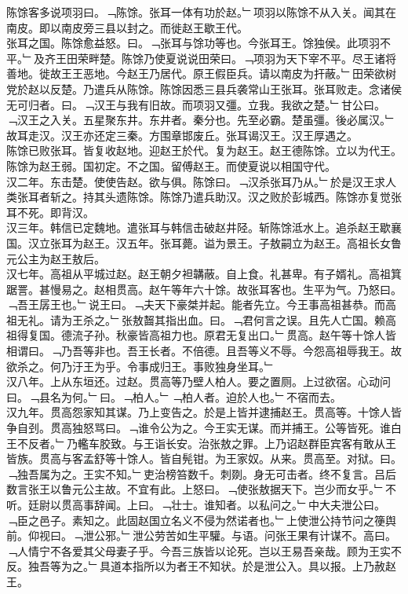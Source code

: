\documentclass{zhvt-classic}
\begin{document}
\hspace*{2em}陈馀客多说项羽曰。﹁陈馀。张耳一体有功於赵。﹂项羽以陈馀不从入关。闻其在南皮。即以南皮旁三县以封之。而徙赵王歇王代。\\
\hspace*{2em}张耳之国。陈馀愈益怒。曰。﹁张耳与馀功等也。今张耳王。馀独侯。此项羽不平。﹂及齐王田荣畔楚。陈馀乃使夏说说田荣曰。﹁项羽为天下宰不平。尽王诸将善地。徙故王王恶地。今赵王乃居代。原王假臣兵。请以南皮为扞蔽。﹂田荣欲树党於赵以反楚。乃遣兵从陈馀。陈馀因悉三县兵袭常山王张耳。张耳败走。念诸侯无可归者。曰。﹁汉王与我有旧故。而项羽又彊。立我。我欲之楚。﹂甘公曰。﹁汉王之入关。五星聚东井。东井者。秦分也。先至必霸。楚虽彊。後必属汉。﹂故耳走汉。汉王亦还定三秦。方围章邯废丘。张耳谒汉王。汉王厚遇之。\\
\hspace*{2em}陈馀已败张耳。皆复收赵地。迎赵王於代。复为赵王。赵王德陈馀。立以为代王。陈馀为赵王弱。国初定。不之国。留傅赵王。而使夏说以相国守代。\\
\hspace*{2em}汉二年。东击楚。使使告赵。欲与俱。陈馀曰。﹁汉杀张耳乃从。﹂於是汉王求人类张耳者斩之。持其头遗陈馀。陈馀乃遣兵助汉。汉之败於彭城西。陈馀亦复觉张耳不死。即背汉。\\
\hspace*{2em}汉三年。韩信已定魏地。遣张耳与韩信击破赵井陉。斩陈馀泜水上。追杀赵王歇襄国。汉立张耳为赵王。汉五年。张耳薨。谥为景王。子敖嗣立为赵王。高祖长女鲁元公主为赵王敖后。\\
\hspace*{2em}汉七年。高祖从平城过赵。赵王朝夕袒韝蔽。自上食。礼甚卑。有子婿礼。高祖箕踞詈。甚慢易之。赵相贯高。赵午等年六十馀。故张耳客也。生平为气。乃怒曰。﹁吾王孱王也。﹂说王曰。﹁夫天下豪桀并起。能者先立。今王事高祖甚恭。而高祖无礼。请为王杀之。﹂张敖齧其指出血。曰。﹁君何言之误。且先人亡国。赖高祖得复国。德流子孙。秋豪皆高祖力也。原君无复出口。﹂贯高。赵午等十馀人皆相谓曰。﹁乃吾等非也。吾王长者。不倍德。且吾等义不辱。今怨高祖辱我王。故欲杀之。何乃汙王为乎。令事成归王。事败独身坐耳。﹂\\
\hspace*{2em}汉八年。上从东垣还。过赵。贯高等乃壁人柏人。要之置厕。上过欲宿。心动问曰。﹁县名为何。﹂曰。﹁柏人。﹂﹁柏人者。迫於人也。﹂不宿而去。\\
\hspace*{2em}汉九年。贯高怨家知其谋。乃上变告之。於是上皆并逮捕赵王。贯高等。十馀人皆争自刭。贯高独怒骂曰。﹁谁令公为之。今王实无谋。而并捕王。公等皆死。谁白王不反者。﹂乃轞车胶致。与王诣长安。治张敖之罪。上乃诏赵群臣宾客有敢从王皆族。贯高与客孟舒等十馀人。皆自髡钳。为王家奴。从来。贯高至。对狱。曰。﹁独吾属为之。王实不知。﹂吏治榜笞数千。刺剟。身无可击者。终不复言。吕后数言张王以鲁元公主故。不宜有此。上怒曰。﹁使张敖据天下。岂少而女乎。﹂不听。廷尉以贯高事辞闻。上曰。﹁壮士。谁知者。以私问之。﹂中大夫泄公曰。﹁臣之邑子。素知之。此固赵国立名义不侵为然诺者也。﹂上使泄公持节问之箯舆前。仰视曰。﹁泄公邪。﹂泄公劳苦如生平驩。与语。问张王果有计谋不。高曰。﹁人情宁不各爱其父母妻子乎。今吾三族皆以论死。岂以王易吾亲哉。顾为王实不反。独吾等为之。﹂具道本指所以为者王不知状。於是泄公入。具以报。上乃赦赵王。\\
\end{document}
